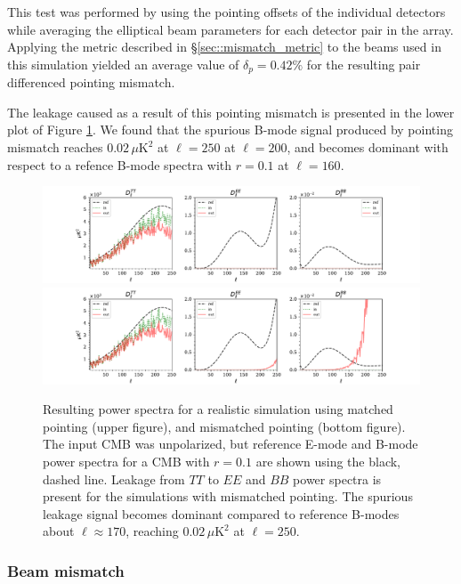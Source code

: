 \documentclass[a4paper,11pt]{article}
\begin{document}
This test was performed by using the pointing offsets of the individual detectors while averaging the elliptical beam parameters for each detector pair in the array. Applying the metric described in \S\ref{sec::mismatch_metric} to the beams used in this simulation yielded an average value of $\delta_p = 0.42\%$ for the resulting pair differenced pointing mismatch. 

The leakage caused as a result of this pointing mismatch is presented in the lower plot of Figure \ref{fig::pisco4class_pointingmismatch}. We found that the spurious B-mode signal produced by pointing mismatch reaches $0.02\, \mu\mathrm{K}^2$ at $\ell = 250$ at $\ell=200$, and becomes dominant with respect to a refence B-mode spectra with $r=0.1$ at $\ell=160$.

\begin{figure}
    \centering
    \includegraphics[width=1.0\textwidth, trim = {2.4cm 0.0cm 2.3cm 0.0cm}, clip ]{figures/unpol_2.pdf}
    \includegraphics[width=1.0\textwidth, trim = {2.4cm 0.0cm 2.3cm 0.0cm}, clip ]{figures/pointingMismatch_2.pdf}
	\caption{Resulting power spectra for a realistic simulation using matched pointing (upper figure), and mismatched pointing (bottom figure). The input CMB was unpolarized, but reference E-mode and B-mode power spectra for a CMB with $r=0.1$ are shown using the black, dashed line. Leakage from $TT$ to $EE$ and $BB$ power spectra is present for the simulations with mismatched pointing. The spurious leakage signal becomes dominant compared to reference B-modes about $\ell \approx 170$, reaching $0.02\, \mu\mathrm{K}^2$ at $\ell = 250$.}
	\label{fig::pisco4class_pointingmismatch}
\end{figure}

\subsubsection{Beam mismatch}
\end{document}
